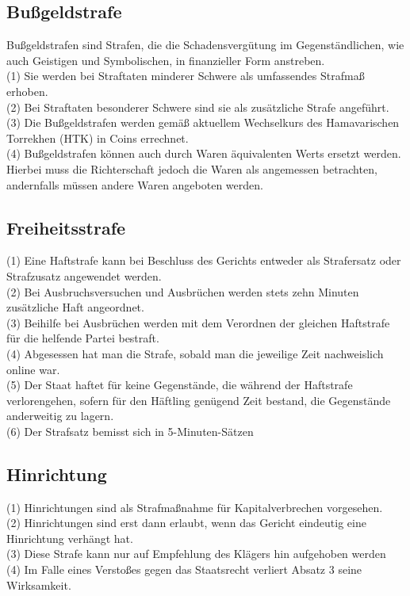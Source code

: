 \documentclass{article}
\begin{document}
\subsection{Bußgeldstrafe}
Bußgeldstrafen sind Strafen, die die Schadensvergütung im Gegenständlichen, wie auch Geistigen und Symbolischen, in finanzieller Form anstreben.\\
(1) Sie werden bei Straftaten minderer Schwere als umfassendes Strafmaß erhoben.\\
(2) Bei Straftaten besonderer Schwere sind sie als zusätzliche Strafe angeführt.\\
(3) Die Bußgeldstrafen werden gemäß aktuellem Wechselkurs des Hamavarischen Torrekhen (HTK) in Coins errechnet.\\
(4) Bußgeldstrafen können auch durch Waren äquivalenten Werts ersetzt werden. Hierbei muss die Richterschaft jedoch die Waren als angemessen betrachten, andernfalls müssen andere Waren angeboten werden.

\subsection{Freiheitsstrafe}
(1) Eine Haftstrafe kann bei Beschluss des Gerichts entweder als Strafersatz oder Strafzusatz angewendet werden.\\
(2) Bei Ausbruchsversuchen und Ausbrüchen werden stets zehn Minuten zusätzliche Haft angeordnet.\\
(3) Beihilfe bei Ausbrüchen werden mit dem Verordnen der gleichen Haftstrafe für die helfende Partei bestraft.\\
(4) Abgesessen hat man die Strafe, sobald man die jeweilige Zeit nachweislich online war.\\
(5) Der Staat haftet für keine Gegenstände, die während der Haftstrafe verlorengehen, sofern für den Häftling genügend Zeit bestand, die Gegenstände anderweitig zu lagern.\\
(6) Der Strafsatz bemisst sich in 5-Minuten-Sätzen

\subsection{Hinrichtung}
(1) Hinrichtungen sind als Strafmaßnahme für Kapitalverbrechen vorgesehen.\\
(2) Hinrichtungen sind erst dann erlaubt, wenn das Gericht eindeutig eine Hinrichtung verhängt hat.\\
(3) Diese Strafe kann nur auf Empfehlung des Klägers hin aufgehoben werden\\
(4) Im Falle eines Verstoßes gegen das Staatsrecht verliert Absatz 3 seine Wirksamkeit.
\end{document}
